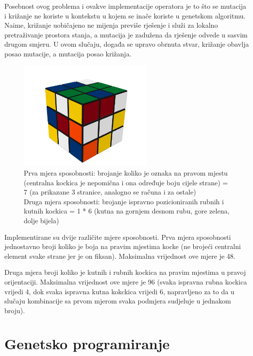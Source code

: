\documentclass[times, utf8, seminar, numeric]{fer}
\begin{document}
Posebnost ovog problema i ovakve implementacije operatora je to što se mutacija i križanje ne koriste u kontekstu u kojem se inače koriste u genetskom algoritmu. Naime, križanje uobičajeno ne mijenja previše rješenje i služi za lokalno pretraživanje prostora stanja, a mutacija je zadužena da rješenje odvede u sasvim drugom smjeru. U ovom slučaju, događa se upravo obrnuta stvar, križanje obavlja posao mutacije, a mutacija posao križanja.

\begin{figure}[h!]
\centering
\includegraphics[width=0.6\textwidth]{image/rubik_cube_scrambled.png}
\caption{Prva mjera sposobnosti: brojanje koliko je oznaka na pravom mjestu (centralna kockica je nepomična i ona određuje boju cijele strane) = 7 (za prikazane 3 stranice, analogno se računa i za ostale)\\
Druga mjera sposobnosti: brojanje ispravno pozicioniranih rubnih i kutnih kockica = 1 * 6 (kutna na gornjem desnom rubu, gore zelena, dolje bijela)}

\end{figure}

Implementirane su dvije različite mjere sposobnosti. 
Prva mjera sposobnosti jednostavno broji koliko je boja na pravim mjestima kocke (ne brojeći centralni element svake strane jer je on fiksan). Maksimalna vrijednost ove mjere je 48.

Druga mjera broji koliko je kutnih i rubnih kockica na pravim mjestima u pravoj orijentaciji. Maksimalna vrijednost ove mjere je 96 (svaka ispravna rubna kockica vrijedi 4, dok svaka ispravna kutna kokckica vrijedi 6, napravljeno za to da u slučaju kombinacije sa prvom mjerom svaka podmjera sudjeluje u jednakom broju).


\chapter{Genetsko programiranje}
\end{document}
